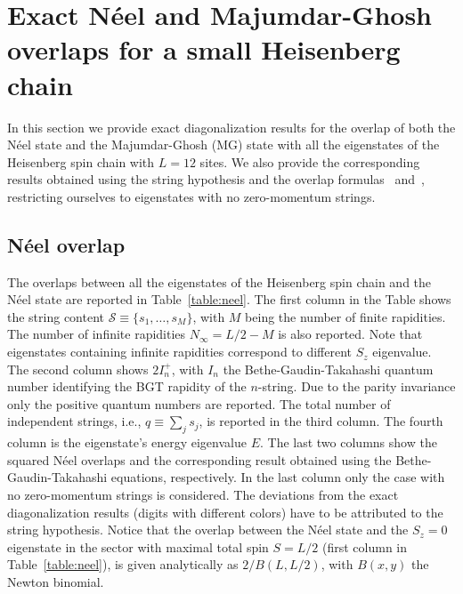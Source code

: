 \documentclass[11pt]{iopart}
\begin{document}
\section{Exact N\'eel and Majumdar-Ghosh overlaps for a small Heisenberg chain} 
\label{app-L12}

In this section we provide exact diagonalization results for the overlap of both the 
N\'eel state and the Majumdar-Ghosh (MG) state with all the eigenstates of the Heisenberg 
spin chain with $L=12$ sites. We also provide the corresponding results obtained 
using the string hypothesis and the overlap formulas~ and~, 
restricting ourselves to eigenstates with no zero-momentum strings. 

\subsection{N\'eel overlap}
\label{app-neel}

The overlaps between all the eigenstates of the Heisenberg spin chain and the N\'eel 
state are reported in Table~\ref{table:neel}. The first column in the Table shows 
the string content ${\mathcal S}\equiv\{s_1,\dots,s_M\}$, with $M$ being the number 
of finite rapidities. The number of infinite rapidities $N_{\infty}=L/2-M$ is also 
reported. Note that eigenstates containing infinite rapidities correspond to 
different $S_z$ eigenvalue. The second column shows 
$2I_n^+$, with $I_n$ the Bethe-Gaudin-Takahashi quantum number identifying the 
BGT rapidity of the $n$-string. Due to the parity invariance only the positive 
quantum numbers are reported. The total number of independent strings, i.e., 
$q\equiv\sum_js_j$, is reported in the third column. The fourth column is the 
eigenstate's energy eigenvalue $E$. The last two columns show the squared N\'eel 
overlaps and the corresponding result obtained using the Bethe-Gaudin-Takahashi 
equations, respectively. In the last column only the case with no zero-momentum 
strings is considered. The deviations from the exact diagonalization results (digits 
with different colors) have to be attributed to the string hypothesis. Notice that  
the overlap between the N\'eel state and the $S_z=0$ eigenstate in the sector with 
maximal total spin $S=L/2$ (first column in Table~\ref{table:neel}), is given 
analytically as $2/B(L,L/2)$, with $B(x,y)$ the Newton binomial. 
\end{document}
